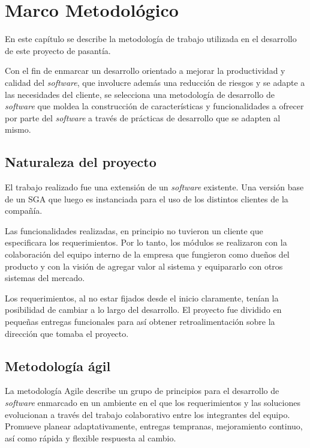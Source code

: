 \chapter{Marco Metodológico}
\thispagestyle{empty} %

En este capítulo se describe la metodología de trabajo utilizada en el desarrollo de este proyecto de pasantía.

Con el fin de enmarcar un desarrollo orientado a mejorar la productividad y calidad del \emph{software}, que involucre además una reducción de riesgos y se adapte a las necesidades del cliente, se selecciona una metodología de desarrollo de \emph{software} que moldea la construcción de características y funcionalidades a ofrecer por parte del \emph{software} a través de prácticas de desarrollo que se adapten al mismo.

\section{Naturaleza del proyecto}
El trabajo realizado fue una extensión de un \emph{software} existente. Una versión base de un \gls{SGA} que luego es instanciada para el uso de los distintos clientes de la compañía. 

Las funcionalidades realizadas, en principio no tuvieron un cliente que especificara los requerimientos. Por lo tanto, los módulos se realizaron con la colaboración del equipo interno de la empresa que fungieron como dueños del producto y con la visión de agregar valor al sistema y equipararlo con otros sistemas del mercado.

Los requerimientos, al no estar fijados desde el inicio claramente, tenían la posibilidad de cambiar a lo largo del desarrollo. El proyecto fue dividido en pequeñas entregas funcionales para así obtener retroalimentación sobre la dirección que tomaba el proyecto.

\section{Metodología ágil}

La metodología Agile describe un grupo de principios para el desarrollo de \emph{software} enmarcado en un ambiente en el que los requerimientos y las soluciones evolucionan a través del trabajo colaborativo entre los integrantes del equipo. Promueve planear adaptativamente, entregas tempranas, mejoramiento continuo, así como rápida y flexible respuesta al cambio.

